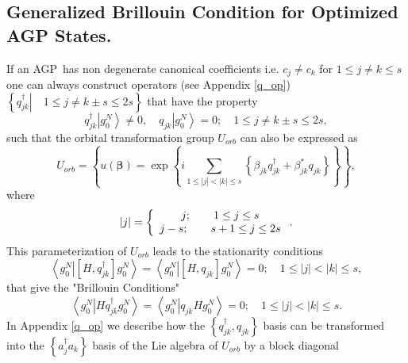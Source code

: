 \documentclass[aps,preprint]{revtex4}%
\begin{document}
\subsection{Generalized Brillouin Condition for Optimized AGP
States.\label{Brillouin}}

If an AGP\ has non degenerate canonical coefficients i.e. $c_{j}\neq c_{k}$
for $1\leq j\neq k\leq s$ one can \cite{weiner_ad_04}\cite{Weiner83a}%
\cite{Kurtz83} always construct operators (see Appendix \ref{q_op}) $\left\{
\left.  q_{jk}^{\dagger}\right\vert \quad1\leq j\neq k\pm s\leq2s\right\}  $
that have the property
\begin{equation}
q_{jk}^{\dagger}\left\vert g_{0}^{N}\right\rangle \neq0,\quad q_{jk}\left\vert
g_{0}^{N}\right\rangle =0;\quad1\leq j\neq k\pm s\leq2s,
\end{equation}
such that the orbital transformation group $U_{orb}$ can also be expressed as
\begin{equation}
U_{orb}=\left\{  u\left(  \bm{\beta}\right)  =\exp\left\{  i\sum
_{1\leq\left\vert j\right\vert <\left\vert k\right\vert \leq s}\left\{
\beta_{jk}q_{jk}^{\dagger}+\beta_{jk}^{\ast}q_{jk}\right\}  \right\}
\right\}  ,
\end{equation}
where
\begin{equation}
\left\vert j\right\vert =\left\{
\begin{array}
[c]{c}%
j;\qquad1\leq j\leq s\\
j-s;\qquad s+1\leq j\leq2s
\end{array}
\right.  .
\end{equation}
This parameterization of $U_{orb}$ leads to the stationarity conditions
\begin{equation}
\left\langle \left.  g_{0}^{N}\right\vert \left[  H,q_{jk}^{\dagger}\right]
g_{0}^{N}\right\rangle =\left\langle \left.  g_{0}^{N}\right\vert \left[
H,q_{jk}\right]  g_{0}^{N}\right\rangle =0;\quad1\leq\left\vert j\right\vert
<\left\vert k\right\vert \leq s,
\end{equation}
that give the "Brillouin Conditions"
\begin{equation}
\left\langle \left.  g_{0}^{N}\right\vert Hq_{jk}^{\dagger}g_{0}%
^{N}\right\rangle =\left\langle \left.  g_{0}^{N}\right\vert q_{jk}Hg_{0}%
^{N}\right\rangle =0;\quad1\leq\left\vert j\right\vert <\left\vert
k\right\vert \leq s. \label{BC}%
\end{equation}
In Appendix \ref{q_op} we describe how the $\left\{  q_{jk}^{\dagger}%
,q_{jk}\right\}  $ basis can be transformed into the $\left\{  a_{j}^{\dagger
}a_{k}\right\}  $ basis of the Lie algebra of $U_{orb}$ by a block diagonal
\end{document}

